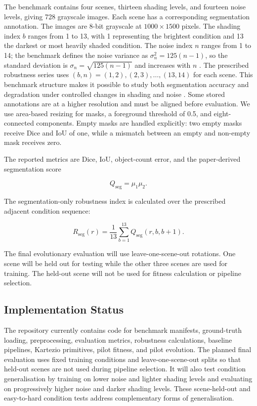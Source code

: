 \documentclass[11pt,a4paper]{article}
\begin{document}
The benchmark contains four scenes, thirteen shading levels, and fourteen noise levels, giving 728 grayscale images. Each scene has a corresponding segmentation annotation. The images are 8-bit grayscale at $1000\times1500$ pixels. The shading index $b$ ranges from 1 to 13, with 1 representing the brightest condition and 13 the darkest or most heavily shaded condition. The noise index $n$ ranges from 1 to 14; the benchmark defines the noise variance as $\sigma_n^2=125(n-1)$, so the standard deviation is $\sigma_n=\sqrt{125(n-1)}$ and increases with $n$ \cite{khan2015}. The prescribed robustness series uses $(b,n)=(1,2),(2,3),\ldots,(13,14)$ for each scene. This benchmark structure makes it possible to study both segmentation accuracy and degradation under controlled changes in shading and noise \cite{khan2015,mikes2022,kamann2021,hendrycks2019}. Some stored annotations are at a higher resolution and must be aligned before evaluation. We use area-based resizing for masks, a foreground threshold of 0.5, and eight-connected components. Empty masks are handled explicitly: two empty masks receive Dice and IoU of one, while a mismatch between an empty and non-empty mask receives zero.

The reported metrics are Dice, IoU, object-count error, and the paper-derived segmentation score

\begin{equation}
    Q_{\mathrm{seg}}=\mu_1\mu_2.
\end{equation}

The segmentation-only robustness index is calculated over the prescribed adjacent condition sequence:

\begin{equation}
    R_{\mathrm{seg}}(r)=\frac{1}{13}\sum_{b=1}^{13}Q_{\mathrm{seg}}(r,b,b+1).
\end{equation}

The final evolutionary evaluation will use leave-one-scene-out rotations. One scene will be held out for testing while the other three scenes are used for training. The held-out scene will not be used for fitness calculation or pipeline selection.

\subsection{Implementation Status}
\label{sec:status}

The repository currently contains code for benchmark manifests, ground-truth loading, preprocessing, evaluation metrics, robustness calculations, baseline pipelines, Kartezio primitives, pilot fitness, and pilot evolution. The planned final evaluation uses fixed training conditions and leave-one-scene-out splits so that held-out scenes are not used during pipeline selection. It will also test condition generalisation by training on lower noise and lighter shading levels and evaluating on progressively higher noise and darker shading levels. These scene-held-out and easy-to-hard condition tests address complementary forms of generalisation.
\end{document}
